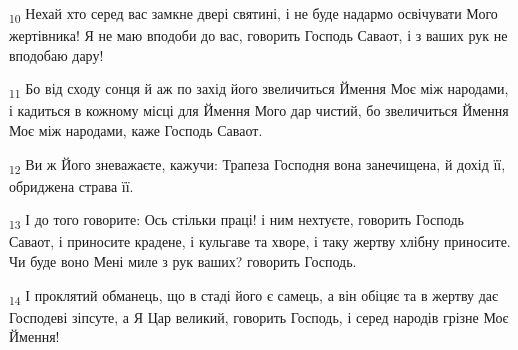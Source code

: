 \begin{tcolorbox}
\textsubscript{10} Нехай хто серед вас замкне двері святині, і не буде надармо освічувати Мого жертівника! Я не маю вподоби до вас, говорить Господь Саваот, і з ваших рук не вподобаю дару!
\end{tcolorbox}
\begin{tcolorbox}
\textsubscript{11} Бо від сходу сонця й аж по захід його звеличиться Ймення Моє між народами, і кадиться в кожному місці для Ймення Мого дар чистий, бо звеличиться Ймення Моє між народами, каже Господь Саваот.
\end{tcolorbox}
\begin{tcolorbox}
\textsubscript{12} Ви ж Його зневажаєте, кажучи: Трапеза Господня вона занечищена, й дохід її, обриджена страва її.
\end{tcolorbox}
\begin{tcolorbox}
\textsubscript{13} І до того говорите: Ось стільки праці! і ним нехтуєте, говорить Господь Саваот, і приносите крадене, і кульгаве та хворе, і таку жертву хлібну приносите. Чи буде воно Мені миле з рук ваших? говорить Господь.
\end{tcolorbox}
\begin{tcolorbox}
\textsubscript{14} І проклятий обманець, що в стаді його є самець, а він обіцяє та в жертву дає Господеві зіпсуте, а Я Цар великий, говорить Господь, і серед народів грізне Моє Ймення!
\end{tcolorbox}
